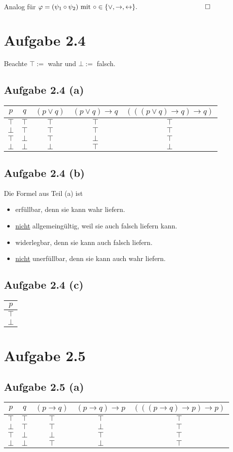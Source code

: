 \documentclass[12pt,a4paper]{article}
\begin{document}
Analog für $\varphi=(\psi_1\circ\psi_2)\mit\circ\in\lbrace\vee,\to,\leftrightarrow\rbrace.\qquad\qquad\qquad\qquad\qquad\square$

\section*{Aufgabe 2.4}
Beachte $\top:=$ wahr und $\bot:=$ falsch.
\subsection*{Aufgabe 2.4 (a)}
\begin{tabular}{c|c||c|c|c}
$p$ & $q$ & $(p\vee q)$ & $(p\vee q)\to q$ & $(((p\vee q)\to q)\to q)$\\ \hline
$\top$ & $\top$ & $\top$ & $\top$ & $\top$\\
$\bot$ & $\top$ & $\top$ & $\top$ & $\top$\\
$\top$ & $\bot$ & $\top$ & $\bot$ & $\top$\\
$\bot$ & $\bot$ & $\bot$ & $\top$ & $\bot$
\end{tabular}

\subsection*{Aufgabe 2.4 (b)}
Die Formel aus Teil (a) ist
\begin{itemize}
\item erfüllbar, denn sie kann wahr liefern.
\item \underline{nicht} allgemeingültig, weil sie auch falsch liefern kann.
\item widerlegbar, denn sie kann auch falsch liefern.
\item \underline{nicht} unerfüllbar, denn sie kann auch wahr liefern.
\end{itemize}

\subsection*{Aufgabe 2.4 (c)}
\begin{tabular}{c}
$p$\\ \hline
$\top$\\
$\bot$
\end{tabular}

\section*{Aufgabe 2.5}
\subsection*{Aufgabe 2.5 (a)}
\begin{tabular}{c|c||c|c|c}
$p$ & $q$ & $(p\to q)$ & $(p\to q)\to p$ & $(((p\to q)\to p)\to p)$\\ \hline
$\top$ & $\top$ & $\top$ & $\top$ & $\top$ \\
$\bot$ & $\top$ & $\top$ & $\bot$ & $\top$ \\
$\top$ & $\bot$ & $\bot$ & $\top$ & $\top$\\
$\bot$ & $\bot$ & $\top$ & $\bot$ & $\top$
\end{tabular}\\
\end{document}
